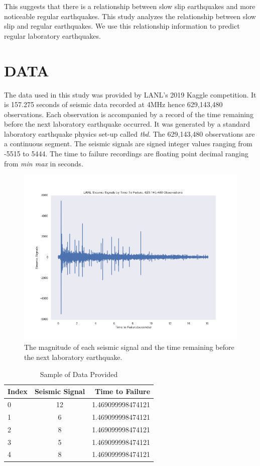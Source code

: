 \documentclass[]{llncs}
\begin{document}
This suggests that there is a relationship between slow slip earthquakes and more noticeable regular earthquakes\cite{SlowSlip}. This study analyzes the relationship between slow slip and regular earthquakes. We use this relationship information to predict regular laboratory earthquakes. \par

\section{DATA} The data used in this study was provided by LANL's 2019 Kaggle competition\cite{kaggle}. It is 157.275 seconds of seismic data recorded at 4MHz hence 629,143,480 observations. Each observation is accompanied by a record of the time remaining before the next laboratory earthquake occurred. It was generated by a standard laboratory earthquake physics set-up called {\em tbd}. The 629,143,480 observations are a continuous segment. The seismic signals are signed integer values ranging from -5515 to 5444. The time to failure recordings are floating point decimal ranging from {\em min max} in seconds. \par

\begin{figure}[h]
	\centering
	\includegraphics[width=0.7\linewidth]{../GPUProject/allDataDefaultPlot}
	\caption{The magnitude of each seismic signal and the time remaining before the next laboratory earthquake.}
	\label{fig:alldatadefaultplot}
\end{figure}

\begin{table}[h!]
	\begin{center}
		\caption{Sample of Data Provided}
		\label{tab:table1}
		\begin{tabular}{l|c|r} %
			\textbf{Index} & \textbf{Seismic Signal} & \textbf{Time to Failure}\\
			\hline
			0 & 12 & 1.469099998474121 \\ 
			1 & 6 & 1.469099998474121 \\ 
			2 & 8 & 1.469099998474121 \\ 
			3 & 5 & 1.469099998474121 \\ 
			4 & 8 & 1.469099998474121 \\ 
		\end{tabular}
	\end{center}
\end{table}
\end{document}
